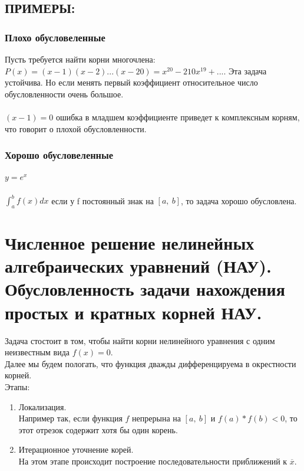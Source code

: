 \documentclass[16pt]{article}
\begin{document}
			\subsection{ПРИМЕРЫ:}
			\subsubsection{Плохо обусловеленные}
			Пусть требуется найти корни многочлена:\\
			$P(x) = (x-1)(x-2)...(x-20)=x^{20} - 210 x^{19} + ... $. Эта задача устойчива. Но если менять первый коэффициент относительное число обусловленности очень большое.\\ \\
			$(x-1)=0$ ошибка в младшем коэффициенте приведет к комплексным корням, что говорит о плохой обусловленности.
			\subsubsection{Хорошо обусловеленные}
			$y = e^x$\\ \\
			$\int_{a}^{b}f(x) dx$ если у f постоянный знак на $[a,\ b]$, то задача хорошо обусловлена. 
			
		\section{Численное решение нелинейных алгебраических уравнений (НАУ). Обусловленность задачи нахождения простых и кратных корней НАУ.}
			Задача стостоит в том, чтобы найти корни нелинейного уравнения с одним неизвестным вида $f(x)=0$.\\
			Далее мы будем пологать, что функция дважды дифференцируема в окрестности корней.\\
			Этапы:\\
			\begin{enumerate}
				\item{
					Локализация.\\
					Например так, если функция $f$ непрерына на $[a,\ b]$ и $f(a)*f(b)<0$, то этот отрезок содержит хотя бы один корень.
				}
				\item{
					Итерационное уточнение корей.\\
					На этом этапе происходит построение последовательности приближений к $\overline{x}$.
				}
			\end{enumerate}
\end{document}

